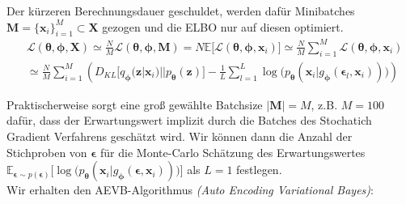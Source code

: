 \documentclass[12pt]{article}
\newcommand{\qenc}{q_{\boldsymbol\phi}(\mathbf{z}|\mathbf{x}_i)}
\newcommand{\z}{\mathbf{z}}
\begin{document}
	Der kürzeren Berechnungsdauer geschuldet, werden dafür Minibatches $\textbf{M} = \{\textbf{x}_{i}\}_{i=1}^{M} \subset \textbf{X}$ gezogen und die ELBO nur auf diesen optimiert.
	\begin{align*}
	&\mathcal{L}(\boldsymbol\theta,\boldsymbol\phi,\textbf{X}) \simeq  \frac{N}{M}\mathcal{L}(\boldsymbol\theta,\boldsymbol\phi,\textbf{M}) = N\mathbb{E}\lbrack\mathcal{L}(\boldsymbol\theta,\boldsymbol\phi,\textbf{x}_{i})\rbrack \simeq \frac{N}{M}\sum_{i=1}^{M}\mathcal{L}(\boldsymbol\theta,\boldsymbol\phi,\textbf{x}_{i})\\
	&\simeq \frac{N}{M}\sum_{i=1}^{M}  \left(D_{KL}\big[\qenc||p_{\boldsymbol\theta}(\z)\big] - \frac{1}{L}\sum_{l=1}^{L}\log\big(p_{\boldsymbol\theta}(\textbf{x}_{i}|g_{\boldsymbol\phi}(\boldsymbol\epsilon_{l},\textbf{x}_{i}))\big)\right)
	\end{align*}

	Praktischerweise sorgt eine groß gewählte Batchsize $|\textbf{M}| = M$, z.B. $M=100$ dafür, dass der Erwartungswert implizit durch die Batches des Stochatich Gradient Verfahrens geschätzt wird. Wir können dann die Anzahl der Stichproben von $\boldsymbol\epsilon$ für die Monte-Carlo Schätzung des Erwartungswertes $\mathbb{E}_{\boldsymbol\epsilon\sim p(\boldsymbol\epsilon)}\big[\log\big(p_{\boldsymbol\theta}(\textbf{x}_{i}|g_{\boldsymbol\phi}(\boldsymbol\epsilon,\textbf{x}_{i}))\big)\big]$ als $L=1$ festlegen.
	\\
	Wir erhalten den AEVB-Algorithmus \emph{(Auto Encoding Variational Bayes)}: \\
\end{document}
